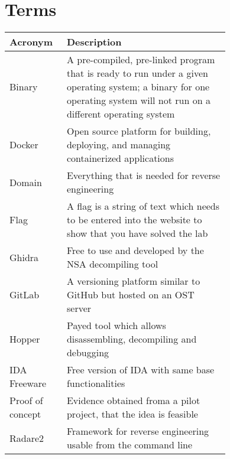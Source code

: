 \section*{Terms}
\begin{table}[H]
    \begin{tabular}{|lp{0.744\linewidth}|}
    \hline
    \textbf{Acronym} & \textbf{Description}\\
    \hline
    \hline
    Binary           & A pre-compiled, pre-linked program that is ready to run under a given operating system; a binary for one operating system will not run on a different operating system         \\
    Docker           & Open source platform for building, deploying, and managing containerized applications         \\
    Domain           & Everything that is needed for reverse engineering         \\
    Flag             & A flag is a string of text which needs to be entered into the website to show that you have solved the lab         \\
    Ghidra           & Free to use and developed by the NSA decompiling tool         \\
    GitLab           & A versioning platform similar to GitHub but hosted on an OST server \\
    Hopper           & Payed tool which allows disassembling, decompiling and debugging         \\
    IDA Freeware     & Free version of IDA with same base functionalities        \\
    Proof of concept & Evidence obtained froma a pilot project, that the idea is feasible         \\
    Radare2          & Framework for reverse engineering usable from the command line         \\
    \hline
    \end{tabular}
\end{table}
